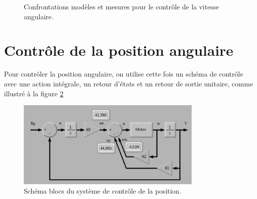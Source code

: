 \documentclass[frenchb, paper=a4, fontsize=11pt]{scrartcl}
\numberwithin{equation}{section}					%
\numberwithin{figure}{section}					%
\numberwithin{table}{section}						%
\begin{document}
\begin{figure}[ht]
	\centering
	
	\caption{Confrontations modèles et mesures pour le contrôle
	de la vitesse angulaire.}
	\label{fig:angular_speed_control}
\end{figure}

\section{Contrôle de la position angulaire}
Pour contrôler la position angulaire, on utilise cette fois un schéma de contrôle
avec une action intégrale, un retour d'états et un retour de sortie unitaire,
comme illustré à la figure \ref{fig:block_diagram_position_control}

\begin{figure}[ht]
	\centering
	\includegraphics[width=0.8\textwidth]{img/block_diagram_position_control.png}
	\caption{Schéma blocs du système de contrôle de la position.}
	\label{fig:block_diagram_position_control}
\end{figure}
\end{document}
